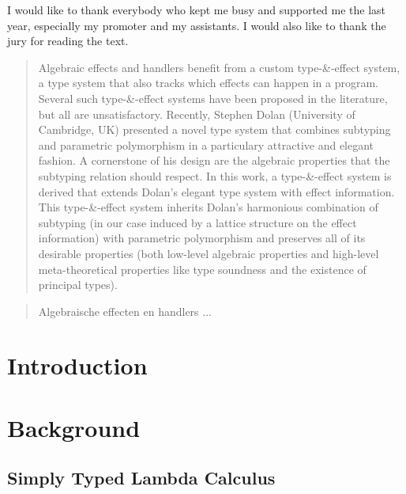 \documentclass[master=ecws, masteroption=ai]{kulemt}
\begin{document}
\begin{preface}
  I would like to thank everybody who kept me busy and supported me the last year,
  especially my promoter and my assistants. I would also like to thank the
  jury for reading the text.
\end{preface}

\tableofcontents*

\begin{abstract}
  Algebraic effects and handlers benefit from a custom type-\&-effect system, a type system that also tracks which effects can happen in a program. Several such type-\&-effect systems have been proposed in the literature, but all are unsatisfactory. Recently, Stephen Dolan (University of Cambridge, UK) presented a novel type system that combines subtyping and parametric polymorphism in a particulary attractive and elegant fashion. A cornerstone of his design are the algebraic properties that the subtyping relation should respect. In this work, a type-\&-effect system is derived that extends Dolan's elegant type system with effect information. This type-\&-effect system inherits Dolan's harmonious combination of subtyping (in our case induced by a lattice structure on the effect information) with parametric polymorphism and preserves all of its desirable properties (both low-level algebraic properties and high-level meta-theoretical properties like type soundness and the existence of principal types).
\end{abstract}

\renewcommand{\abstractname}{Nederlandstalige Samenvatting}

\begin{abstract}
  Algebraische effecten en handlers ...
\end{abstract}

\listoffigures
\listoftodos

\setlength{\parindent}{0pt}
\setlength{\parskip}{1em}

\mainmatter

\chapter{Introduction}


\chapter{Background}\label{background}
  \section{Simply Typed Lambda Calculus}
  
\end{document}
